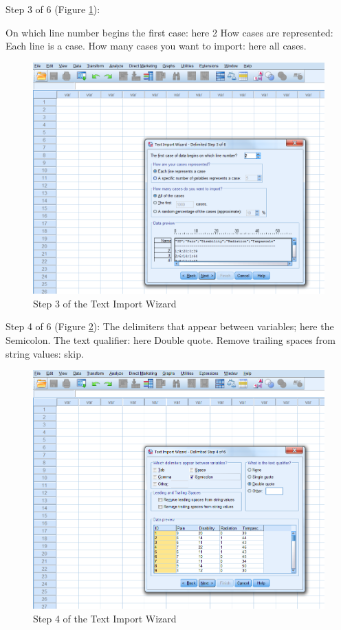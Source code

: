\documentclass[]{book}
\begin{document}
Step 3 of 6 (Figure \ref{fig:fig21}):

On which line number begins the first case: here 2 How cases are
represented: Each line is a case. How many cases you want to import:
here all cases.

\begin{figure}

{\centering \includegraphics[width=0.95\linewidth]{images/fig1.21} 

}

\caption{Step 3 of the Text Import Wizard}\label{fig:fig21}
\end{figure}

Step 4 of 6 (Figure \ref{fig:fig22}): The delimiters that appear between
variables; here the Semicolon. The text qualifier: here Double quote.
Remove trailing spaces from string values: skip.

\begin{figure}

{\centering \includegraphics[width=0.95\linewidth]{images/fig1.22} 

}

\caption{Step 4 of the Text Import Wizard}\label{fig:fig22}
\end{figure}
\end{document}
